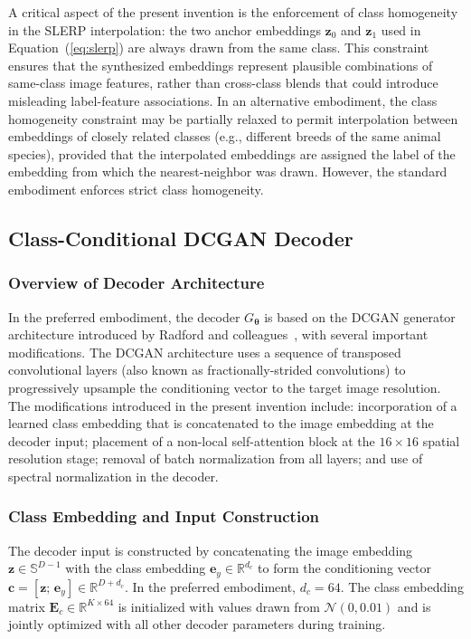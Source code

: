 \documentclass[12pt,letterpaper]{article}
\newcommand{\bz}{\mathbf{z}}
\newcommand{\bc}{\mathbf{c}}
\newcommand{\btheta}{\bm{\theta}}
\newcommand{\RR}{\mathbb{R}}
\begin{document}
A critical aspect of the present invention is the enforcement of class
homogeneity in the SLERP interpolation: the two anchor embeddings $\bz_0$ and
$\bz_1$ used in Equation~(\ref{eq:slerp}) are always drawn from the same class.
This constraint ensures that the synthesized embeddings represent plausible
combinations of same-class image features, rather than cross-class blends that
could introduce misleading label-feature associations. In an alternative
embodiment, the class homogeneity constraint may be partially relaxed to permit
interpolation between embeddings of closely related classes (e.g., different
breeds of the same animal species), provided that the interpolated embeddings
are assigned the label of the embedding from which the nearest-neighbor was
drawn. However, the standard embodiment enforces strict class homogeneity.

\subsection{Class-Conditional DCGAN Decoder}

\subsubsection{Overview of Decoder Architecture}

In the preferred embodiment, the decoder $G_{\btheta}$ is based on the DCGAN
generator architecture introduced by Radford and colleagues~\cite{radford2016},
with several important modifications. The DCGAN architecture uses a sequence
of transposed convolutional layers (also known as fractionally-strided
convolutions) to progressively upsample the conditioning vector to the target
image resolution. The modifications introduced in the present invention include:
incorporation of a learned class embedding that is concatenated to the image
embedding at the decoder input; placement of a non-local self-attention block
at the $16 \times 16$ spatial resolution stage; removal of batch normalization
from all layers; and use of spectral normalization in the decoder.

\subsubsection{Class Embedding and Input Construction}

The decoder input is constructed by concatenating the image embedding
$\bz \in \mathbb{S}^{D-1}$ with the class embedding $\bm{e}_y \in \RR^{d_c}$
to form the conditioning vector $\bc = [\bz;\, \bm{e}_y] \in \RR^{D + d_c}$.
In the preferred embodiment, $d_c = 64$. The class embedding matrix
$\mathbf{E}_c \in \RR^{K \times 64}$ is initialized with values drawn from
$\mathcal{N}(0, 0.01)$ and is jointly optimized with all other decoder
parameters during training.
\end{document}
